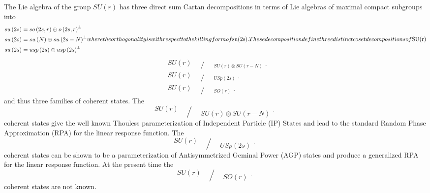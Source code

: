 \documentclass[aps,preprint]{revtex4}%
\begin{document}
The Lie algebra of the group $SU(r)$ has three direct sum Cartan
decompositions in terms of Lie algebras of maximal compact subgroups into%
\begin{subequations}
\begin{align}
su\left(  2s\right)   &  =so\left(  2s,r\right)  \oplus o\left(  2s,r\right)
^{\bot}\\
su\left(  2s\right)   &  =su\left(  N\right)  \oplus su\left(  2s-N\right)
^{\bot}\\
su\left(  2s\right)   &  =usp\left(  2s\right)  \oplus usp\left(  2s\right)
^{\bot}%
\end{align}
where the orthogonality is with respect to the killing form of $su(2s)$. These
decomposition define three distinct coset decompositions of $SU(r)$%
\end{subequations}
\begin{align}
&  SU\left(  r\right)
\genfrac{/}{.}{0pt}{}{{}}{SU\left(  r\right)  \otimes SU\left(  r-N\right)  }%
\\
&  SU\left(  r\right)
\genfrac{/}{.}{0pt}{}{{}}{USp\left(  2s\right)  }%
\\
&  SU\left(  r\right)
\genfrac{/}{.}{0pt}{}{{}}{SO\left(  r\right)  }%
\end{align}
and thus three families of coherent states. The%
\begin{equation}
SU\left(  r\right)
\genfrac{/}{.}{0pt}{}{{}}{SU\left(  r\right)  \otimes SU\left(  r-N\right)  }%
\end{equation}
coherent states give the well known Thouless parameterization of Independent
Particle (IP) States and lead to the standard Random Phase Approximation (RPA)
for the linear response function. The
\begin{equation}
SU\left(  r\right)
\genfrac{/}{.}{0pt}{}{{}}{USp\left(  2s\right)  }%
\end{equation}
coherent states can be shown to be a parameterization of Antisymmetrized
Geminal Power (AGP) states and produce a generalized RPA for the linear
response function. At the present time the
\begin{equation}
SU\left(  r\right)
\genfrac{/}{.}{0pt}{}{{}}{SO\left(  r\right)  }%
\end{equation}
coherent states are not known.
\end{document}
